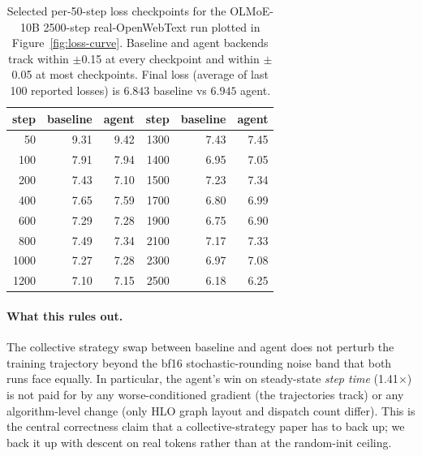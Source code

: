\begin{table}[h]
\centering\small
\setlength{\tabcolsep}{4pt}
\begin{tabular}{rrr|rrr}
\toprule
\textbf{step} & \textbf{baseline} & \textbf{agent} & \textbf{step} & \textbf{baseline} & \textbf{agent} \\
\midrule
   50 & 9.31 & 9.42 & 1300 & 7.43 & 7.45 \\
  100 & 7.91 & 7.94 & 1400 & 6.95 & 7.05 \\
  200 & 7.43 & 7.10 & 1500 & 7.23 & 7.34 \\
  400 & 7.65 & 7.59 & 1700 & 6.80 & 6.99 \\
  600 & 7.29 & 7.28 & 1900 & 6.75 & 6.90 \\
  800 & 7.49 & 7.34 & 2100 & 7.17 & 7.33 \\
 1000 & 7.27 & 7.28 & 2300 & 6.97 & 7.08 \\
 1200 & 7.10 & 7.15 & 2500 & 6.18 & 6.25 \\
\bottomrule
\end{tabular}
\caption{Selected per-50-step loss checkpoints for the OLMoE-10B
2500-step real-OpenWebText run plotted in
Figure~\ref{fig:loss-curve}. Baseline and agent backends track
within $\pm$0.15 at every checkpoint and within $\pm$0.05 at most
checkpoints. Final loss (average of last 100 reported losses)
is $6.843$ baseline vs $6.945$ agent.}
\label{tab:loss-curve}
\end{table}

\paragraph{What this rules out.} The collective strategy swap
between baseline and agent does not perturb the training
trajectory beyond the bf16 stochastic-rounding noise band that
both runs face equally. In particular, the agent's win on
steady-state \emph{step time} (1.41$\times$) is not paid for by
any worse-conditioned gradient (the trajectories track) or any
algorithm-level change (only HLO graph layout and dispatch count
differ). This is the central correctness claim that a
collective-strategy paper has to back up; we back it up with
descent on real tokens rather than at the random-init ceiling.


